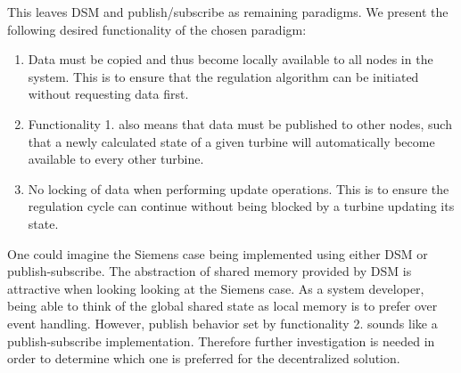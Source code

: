This leaves DSM and publish/subscribe as remaining paradigms. We present the following desired functionality of the chosen paradigm:
\begin{enumerate}
	\item Data must be copied and thus become locally available to all nodes in the system. This is to ensure that the regulation algorithm can be initiated without requesting data first. 
	\item Functionality 1. also means that data must be published to other nodes, such that a newly calculated state of a given turbine will automatically become available to every other turbine. 
	\item No locking of data when performing update operations. This is to ensure the regulation cycle can continue without being blocked by a turbine updating its state.
\end{enumerate}

One could imagine the Siemens case being implemented using either DSM or publish-subscribe. The abstraction of shared memory provided by DSM is attractive when looking looking at the Siemens case. As a system developer, being able to think of the global shared state as local memory is to prefer over event handling. However, publish behavior set by functionality 2. sounds like a publish-subscribe implementation. Therefore further investigation is needed in order to determine which one is preferred for the decentralized solution.



